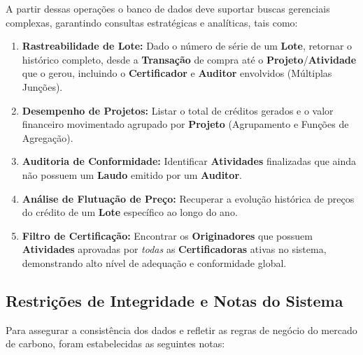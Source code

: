\documentclass[12pt]{article}
\begin{document}
A partir dessas operações o banco de dados deve suportar buscas gerenciais complexas, garantindo consultas estratégicas e analíticas, tais como:
\begin{enumerate}
    \item \textbf{Rastreabilidade de Lote:} Dado o número de série de um \textbf{Lote}, retornar o histórico completo, desde a \textbf{Transação} de compra até o \textbf{Projeto}/\textbf{Atividade} que o gerou, incluindo o \textbf{Certificador} e \textbf{Auditor} envolvidos (Múltiplas Junções).
    \item \textbf{Desempenho de Projetos:} Listar o total de créditos gerados e o valor financeiro movimentado agrupado por \textbf{Projeto} (Agrupamento e Funções de Agregação).
    \item \textbf{Auditoria de Conformidade:} Identificar \textbf{Atividades} finalizadas que ainda não possuem um \textbf{Laudo} emitido por um \textbf{Auditor}.
    \item \textbf{Análise de Flutuação de Preço:} Recuperar a evolução histórica de preços do crédito de um \textbf{Lote} específico ao longo do ano.
    \item \textbf{Filtro de Certificação:} Encontrar os \textbf{Originadores} que possuem \textbf{Atividades} aprovadas por \textit{todas} as \textbf{Certificadoras} ativas no sistema, demonstrando alto nível de adequação e conformidade global.
\end{enumerate}

\subsection{Restrições de Integridade e Notas do Sistema}
Para assegurar a consistência dos dados e refletir as regras de negócio do mercado de carbono, foram estabelecidas as seguintes notas:
\end{document}
